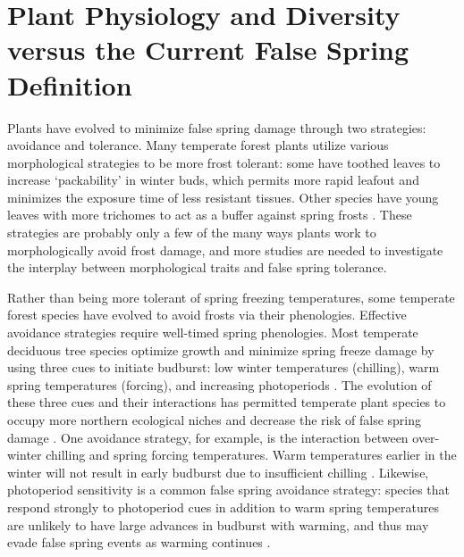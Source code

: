 \documentclass{article}\usepackage[]{graphicx}\usepackage[]{color}
\begin{document}
\section* {Plant Physiology and Diversity versus the Current False Spring Definition}
Plants have evolved to minimize false spring damage through two strategies: avoidance and tolerance. Many temperate forest plants utilize various morphological strategies to be more frost tolerant: some have toothed leaves to increase `packability' in winter buds, which permits more rapid leafout \citep{Edwards2017} and minimizes the exposure time of less resistant tissues. Other species have young leaves with more trichomes to act as a buffer against spring frosts \citep{Prozherina2003, Agrawal2004}. These strategies are probably only a few of the many ways plants work to morphologically avoid frost damage, and more studies are needed to investigate the interplay between morphological traits and false spring tolerance. 

Rather than being more tolerant of spring freezing temperatures, some temperate forest species have evolved to avoid frosts via their phenologies. Effective avoidance strategies require well-timed spring phenologies. Most temperate deciduous tree species optimize growth and minimize spring freeze damage by using three cues to initiate budburst: low winter temperatures (chilling), warm spring temperatures (forcing), and increasing photoperiods \citep{Chuine2010}. The evolution of these three cues and their interactions has permitted temperate plant species to occupy more northern ecological niches \citep{Kollas2014} and decrease the risk of false spring damage %
\citep{Charrier2011}. One avoidance strategy, for example, is the interaction between over-winter chilling and spring forcing temperatures. Warm temperatures earlier in the winter %
will not result in early budburst due to insufficient chilling \citep{Basler2012}. Likewise, photoperiod sensitivity is a common false spring avoidance strategy: species that respond strongly to photoperiod cues in addition to warm spring temperatures are unlikely to have large advances in budburst with warming, and thus may evade false spring events as warming continues \citep{Basler2014}. 
\end{document}

